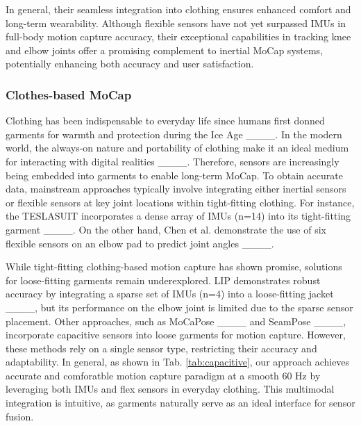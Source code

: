 In general, their seamless integration into clothing ensures enhanced comfort and long-term wearability. Although flexible sensors have not yet surpassed IMUs in full-body motion capture accuracy, their exceptional capabilities in tracking knee and elbow joints offer a promising complement to inertial MoCap systems, potentially enhancing both accuracy and user satisfaction.


\subsubsection{Clothes-based MoCap}

Clothing has been indispensable to everyday life since humans first donned garments for warmth and protection during the Ice Age ____. In the modern world, the always-on nature and portability of clothing make it an ideal medium for interacting with digital realities ____. Therefore, sensors are increasingly being embedded into garments to enable long-term MoCap. To obtain accurate data, mainstream approaches typically involve integrating either inertial sensors or flexible sensors at key joint locations within tight-fitting clothing. For instance, the TESLASUIT incorporates a dense array of IMUs (n=14) into its tight-fitting garment ____. On the other hand, Chen et al. demonstrate the use of six flexible sensors on an elbow pad to predict joint angles ____.

While tight-fitting clothing-based motion capture has shown promise, solutions for loose-fitting garments remain underexplored. LIP demonstrates robust accuracy by integrating a sparse set of IMUs (n=4) into a loose-fitting jacket ____, but its performance on the elbow joint is limited due to the sparse sensor placement. Other approaches, such as MoCaPose ____ and SeamPose ____, incorporate capacitive sensors into loose garments for motion capture. However, these methods rely on a single sensor type, restricting their accuracy and adaptability. In general, as shown in Tab. \ref{tab:capacitive}, our approach achieves accurate and comforatble motion capture paradigm at a smooth 60 Hz by leveraging both IMUs and flex sensors in everyday clothing. This multimodal integration is intuitive, as garments naturally serve as an ideal interface for sensor fusion.




